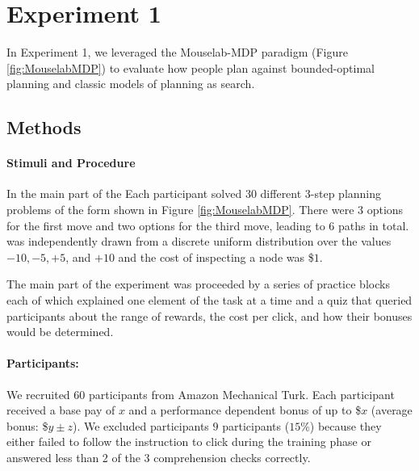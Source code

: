 
\section{Experiment 1}
\label{sec:experiments}

In Experiment 1, we leveraged the Mouselab-MDP paradigm (Figure \ref{fig:MouselabMDP}) to evaluate how people plan against bounded-optimal planning and classic models of planning as search. 


\subsection{Methods}
\paragraph{Stimuli and Procedure}

In the main part of the Each participant solved 30 different 3-step planning problems of the form shown in Figure \ref{fig:MouselabMDP}. There were 3 options for the first move and two options for the third move, leading to 6 paths in total. was independently drawn from a discrete uniform distribution over the values $-10,-5,+5$, and $+10$ and the cost of inspecting a node was \$$1$.

The main part of the experiment was proceeded by a series of practice blocks each of which explained one element of the task at a time and a quiz that queried participants about the range of rewards, the cost per click, and how their bonuses would be determined.

\paragraph{Participants: } We recruited $60$ participants from Amazon Mechanical Turk. Each participant received a base pay of $x$ and a performance dependent bonus of up to \$$x$ (average bonus: \$$y \pm z$). We excluded participants $9$ participants ($15$\%) because they either failed to follow the instruction to click during the training phase or answered less than 2 of the 3 comprehension checks correctly. 

